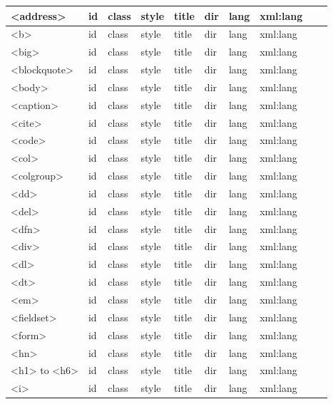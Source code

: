 \begin{longtable}{|l|l|l|l|l|l|l|l|l|l|}
\hline
<address>	&	id &	class &	style &	title & dir & 	lang	& xml:lang & 			&		 \\
\hline
<b>			&	id &	class &	style &	title & dir & 	lang	& xml:lang & 			&		 \\
\hline
<big>		&	id &	class &	style &	title & dir & 	lang	& xml:lang & 			&		 \\
\hline
<blockquote>	&	id &	class &	style &	title & dir & 	lang	& xml:lang & 			&		 \\
\hline
<body>		&	id &	class &	style &	title & dir & 	lang	& xml:lang & 			&		 \\
\hline
<caption>		&	id &	class &	style &	title & dir & 	lang	& xml:lang & 			&		 \\
\hline
<cite>		&	id &	class &	style &	title & dir & 	lang	& xml:lang & 			&		 \\
\hline
<code>		&	id &	class &	style &	title & dir & 	lang	& xml:lang & 			&		 \\
\hline
<col>		&	id &	class &	style &	title & dir & 	lang	& xml:lang & 			&		 \\
\hline
<colgroup>	&	id &	class &	style &	title & dir & 	lang	& xml:lang & 			&		 \\
\hline
<dd>		&	id &	class &	style &	title & dir & 	lang	& xml:lang & 			&		 \\
\hline
<del>		&	id &	class &	style &	title & dir & 	lang	& xml:lang & 			&		 \\
\hline
<dfn>		&	id &	class &	style &	title & dir & 	lang	& xml:lang & 			&		 \\
\hline
<div>		&	id &	class &	style &	title & dir & 	lang	& xml:lang & 			&		 \\
\hline
<dl>			&	id &	class &	style &	title & dir & 	lang	& xml:lang & 			&		 \\
\hline
<dt>			&	id &	class &	style &	title & dir & 	lang	& xml:lang & 			&		 \\
\hline
<em>		&	id &	class &	style &	title & dir & 	lang	& xml:lang & 			&		 \\
\hline
<fieldset>	&	id &	class &	style &	title & dir & 	lang	& xml:lang & 			&		 \\
\hline
<form>		&	id &	class &	style &	title & dir & 	lang	& xml:lang & 			&		 \\
\hline
<hn>		&	id &	class &	style &	title & dir & 	lang	& xml:lang & 			&		 \\
\hline
<h1> to <h6>	&	id &	class &	style &	title & dir & 	lang	& xml:lang & 			&		 \\
\hline
<i>			&	id &	class &	style &	title & dir & 	lang	& xml:lang & 			&		 \\

\end{longtable}
